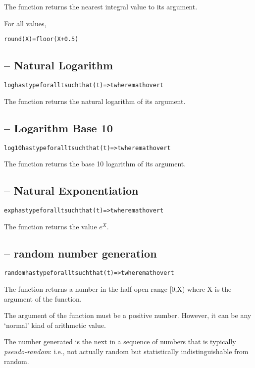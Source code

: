 The  function returns the nearest integral value to its argument. 
\begin{aside}
For all values,
\begin{alltt}
round(X)=floor(X + 0.5)
\end{alltt}
\end{aside}


\subsection{ -- Natural Logarithm}
\begin{alltt}
log has type for all t such that (t)=>t where math over t
\end{alltt}

The  function returns the natural logarithm of its argument.

\subsection{ -- Logarithm Base 10}
\begin{alltt}
log10 has type for all t such that (t)=>t where math over t
\end{alltt}

The  function returns the base 10 logarithm of its argument.


\subsection{ -- Natural Exponentiation}
\begin{alltt}
exp has type for all t such that (t)=>t where math over t
\end{alltt}

The  function returns the value $e^X$.

\subsection{ -- random number generation}
\begin{alltt}
random has type for all t such that (t)=>t where math over t
\end{alltt}

The  function returns a number in the half-open range [0,X) where X is the argument of the function.
\begin{aside}
The argument of the  function must be a positive number. However, it can be any `normal' kind of arithmetic value.
\end{aside}
The number generated is the next in a sequence of numbers that is typically \emph{pseudo-random}: i.e., not actually random but statistically indistinguishable from random.

